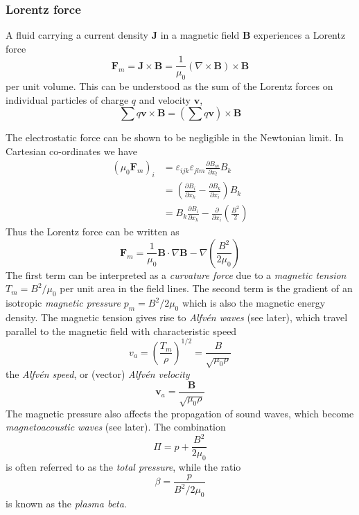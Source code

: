 \documentclass{jknotes}
\begin{document}
\subsubsection{Lorentz force}
A fluid carrying a current density $\symbf{J}$ in a magnetic field $\symbf{B}$
experiences a Lorentz force
\begin{equation}
	\symbf{F}_m = \symbf{J} \times \symbf{B} = \frac{1}{\mu_0} (\nabla \times
	\symbf{B}) \times \symbf{B}
\end{equation}
per unit volume. This can be understood as the sum of the Lorentz forces on
individual particles of charge $q$ and velocity $\symbf{v}$,
\begin{equation}
	\sum q \symbf{v} \times \symbf{B} = \left(\sum q
	\symbf{v}\right)\times\symbf{B}
\end{equation}

The electrostatic force can be shown to be negligible in the Newtonian limit.
In Cartesian co-ordinates we have
\begin{align}
	(\mu_0 \symbf{F}_m)_i &= \varepsilon_{ijk}\varepsilon_{jlm}\frac{\partial
	B_m}{\partial x_l} B_k \\
					  &= \left( \frac{\partial B_i}{\partial x_k} -
					  \frac{\partial B_k}{\partial x_i} \right) B_k \\
					  &= B_k \frac{\partial B_i}{\partial x_k} -
					  \frac{\partial}{\partial x_i} \left(
					  \frac{B^2}{2}\right)
\end{align}
Thus the Lorentz force can be written as
\begin{equation}
	\symbf{F}_m = \frac{1}{\mu_0} \symbf{B}\cdot\nabla\symbf{B} - \nabla
	\left( \frac{B^2}{2\mu_0}\right)
\end{equation}
The first term can be interpreted as a \emph{curvature force} due to a
\emph{magnetic tension} $T_m = B^2/\mu_0$ per unit area in the field lines.
The second term is the gradient of an isotropic \emph{magnetic pressure} $p_m
= B^2/2\mu_0$ which is also the magnetic energy density. The magnetic tension
gives rise to \emph{Alfv\'{e}n waves} (see later), which travel parallel to
the magnetic field with characteristic speed
\begin{equation}
	v_a = \left(\frac{T_m}{\rho}\right)^{1/2} = \frac{B}{\sqrt{\mu_0 \rho}}
\end{equation}
the \emph{Alfv\'{e}n speed}, or (vector) \emph{Alfv\'{e}n velocity}
\begin{equation}
	\symbf{v}_a = \frac{\symbf{B}}{\sqrt{\mu_0 \rho}}
\end{equation}
The magnetic pressure also affects the propagation of sound waves, which
become \emph{magnetoacoustic waves} (see later). The combination
\begin{equation}
	\Pi = p + \frac{B^2}{2\mu_0}
\end{equation}
is often referred to as the \emph{total pressure}, while the ratio
\begin{equation}
	\beta = \frac{p}{B^2/2\mu_0}
\end{equation}
is known as the \emph{plasma beta}. 
\end{document}

